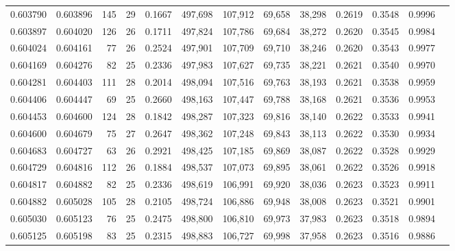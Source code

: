 \begin{tabular}{rrrrrrrrrrrrr}
0.603790 & 0.603896 & 145 &  29 &                                     0.1667 & 497,698 & 107,912 &  69,658 &  38,298 & 0.2619 & 0.3548 & 0.9996 \\
0.603897 & 0.604020 & 126 &  26 &                                     0.1711 & 497,824 & 107,786 &  69,684 &  38,272 & 0.2620 & 0.3545 & 0.9984 \\
0.604024 & 0.604161 &  77 &  26 &                                     0.2524 & 497,901 & 107,709 &  69,710 &  38,246 & 0.2620 & 0.3543 & 0.9977 \\
0.604169 & 0.604276 &  82 &  25 &                                     0.2336 & 497,983 & 107,627 &  69,735 &  38,221 & 0.2621 & 0.3540 & 0.9970 \\
0.604281 & 0.604403 & 111 &  28 &                                     0.2014 & 498,094 & 107,516 &  69,763 &  38,193 & 0.2621 & 0.3538 & 0.9959 \\
0.604406 & 0.604447 &  69 &  25 &                                     0.2660 & 498,163 & 107,447 &  69,788 &  38,168 & 0.2621 & 0.3536 & 0.9953 \\
0.604453 & 0.604600 & 124 &  28 &                                     0.1842 & 498,287 & 107,323 &  69,816 &  38,140 & 0.2622 & 0.3533 & 0.9941 \\
0.604600 & 0.604679 &  75 &  27 &                                     0.2647 & 498,362 & 107,248 &  69,843 &  38,113 & 0.2622 & 0.3530 & 0.9934 \\
0.604683 & 0.604727 &  63 &  26 &                                     0.2921 & 498,425 & 107,185 &  69,869 &  38,087 & 0.2622 & 0.3528 & 0.9929 \\
0.604729 & 0.604816 & 112 &  26 &                                     0.1884 & 498,537 & 107,073 &  69,895 &  38,061 & 0.2622 & 0.3526 & 0.9918 \\
0.604817 & 0.604882 &  82 &  25 &                                     0.2336 & 498,619 & 106,991 &  69,920 &  38,036 & 0.2623 & 0.3523 & 0.9911 \\
0.604882 & 0.605028 & 105 &  28 &                                     0.2105 & 498,724 & 106,886 &  69,948 &  38,008 & 0.2623 & 0.3521 & 0.9901 \\
0.605030 & 0.605123 &  76 &  25 &                                     0.2475 & 498,800 & 106,810 &  69,973 &  37,983 & 0.2623 & 0.3518 & 0.9894 \\
0.605125 & 0.605198 &  83 &  25 &                                     0.2315 & 498,883 & 106,727 &  69,998 &  37,958 & 0.2623 & 0.3516 & 0.9886 \\

\end{tabular}
